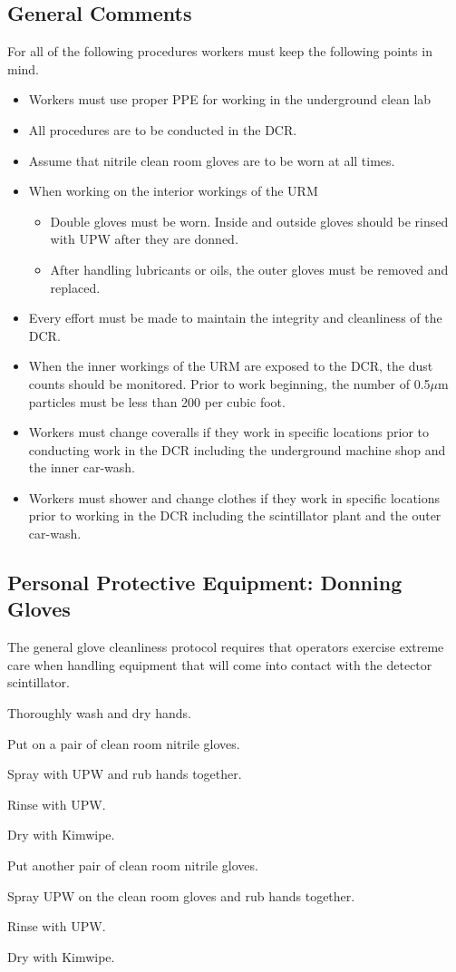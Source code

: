 \documentclass[11pt]{article}
\begin{document}
\subsection{General Comments}
For all of the following procedures workers must keep the following points in mind.
\begin{itemize}
\item Workers must use proper PPE for working in the underground clean lab
\item All procedures are to be conducted in the DCR.
\item Assume that nitrile clean room gloves are to be worn at all times.
\item When working on the interior workings of the URM
  \begin{itemize}
  \item Double gloves must be worn. Inside and outside gloves should be rinsed with UPW after they are donned.
  \item After handling lubricants or oils, the outer gloves must be removed and replaced.
  \end{itemize}
\item Every effort must be made to maintain the integrity and cleanliness of the DCR.
\item When the inner workings of the URM are exposed to the DCR, the dust counts should be monitored. Prior to work beginning, the number of 0.5$\mu$m particles must be less than 200 per cubic foot.
\item Workers must change coveralls if they work in specific locations prior to conducting work in the DCR including the underground machine shop and the inner car-wash.
\item Workers must shower and change clothes if they work in specific locations prior to working in the DCR including the scintillator plant and the outer car-wash. 
\end{itemize}

\subsection{Personal Protective Equipment: Donning Gloves}\label{ss:Rgloves}
The general glove cleanliness protocol requires that operators exercise extreme care when handling equipment that will come into contact with the detector scintillator.
\begin{answerlist}
\item Thoroughly wash and dry hands.
\item Put on a pair of clean room nitrile gloves.
\item Spray with UPW and rub hands together.
\item Rinse with UPW.
\item Dry with Kimwipe.
\item Put another pair of clean room nitrile gloves.
\item Spray UPW on the clean room gloves and rub hands together.
\item Rinse with UPW.
\item Dry with Kimwipe.
\end{answerlist}
\end{document}
